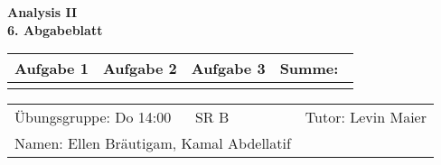 \documentclass[a4paper, 12pt]{scrartcl}
\newcounter{taski}
\begin{document}
\begin{center}
    \textbf{Analysis II\\6. Abgabeblatt}\\[2em]
	\def\arraystretch{2}
    \begin{tabular}{|l|l|l||p{18mm}|}
        \hline
         Aufgabe 1 & Aufgabe 2 & Aufgabe 3 & Summe:~ \\
         \hline &&&\\
         \hline  
    \end{tabular}
\end{center}
\begingroup
\def\arraystretch{1.5}
\begin{tabular}{p{}p{}}
	\hline
    Übungsgruppe: Do 14:00 ~~ SR B& Tutor: Levin Maier \\
    Namen: Ellen Bräutigam, Kamal Abdellatif &\\
    \hline
\end{tabular}
\endgroup
\\
\setcounter{taski}{1}
\end{document}
